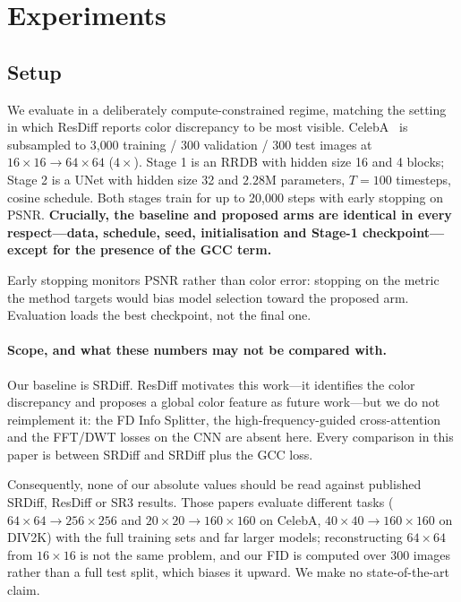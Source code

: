 \documentclass[11pt]{article}
\begin{document}
\section{Experiments}

\subsection{Setup}

We evaluate in a deliberately compute-constrained regime, matching the setting in
which ResDiff reports color discrepancy to be most visible. CelebA~\cite{liu2015faceattributes} is subsampled
to 3{,}000 training / 300 validation / 300 test images at $16\times16 \to
64\times64$ ($4\times$). Stage 1 is an RRDB with hidden size 16 and 4 blocks;
Stage 2 is a UNet with hidden size 32 and $2.28$M parameters, $T=100$ timesteps,
cosine schedule. Both stages train for up to 20{,}000 steps with early stopping
on PSNR. \textbf{Crucially, the baseline and proposed arms are identical in every
respect---data, schedule, seed, initialisation and Stage-1 checkpoint---except for
the presence of the GCC term.}

Early stopping monitors PSNR rather than color error: stopping on the metric the
method targets would bias model selection toward the proposed arm. Evaluation
loads the best checkpoint, not the final one.

\paragraph{Scope, and what these numbers may not be compared with.}
Our baseline is SRDiff. ResDiff motivates this work---it identifies the color
discrepancy and proposes a global color feature as future work---but we do not
reimplement it: the FD Info Splitter, the high-frequency-guided cross-attention
and the FFT/DWT losses on the CNN are absent here. Every comparison in this paper
is between SRDiff and SRDiff plus the GCC loss.

Consequently, none of our absolute values should be read against published
SRDiff, ResDiff or SR3 results. Those papers evaluate different tasks
($64\times64 \to 256\times256$ and $20\times20 \to 160\times160$ on CelebA,
$40\times40 \to 160\times160$ on DIV2K) with the full training sets and far
larger models; reconstructing $64\times64$ from $16\times16$ is not the same
problem, and our FID is computed over 300 images rather than a full test split,
which biases it upward. We make no state-of-the-art claim.
\end{document}
